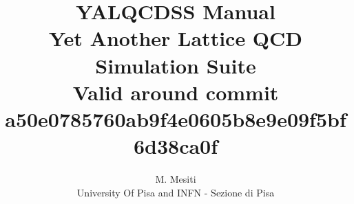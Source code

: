 \documentclass[a4paper,10pt]{book}
\title{{\Huge \bf YALQCDSS Manual} \\
Yet Another Lattice QCD Simulation Suite \\
{\small Valid around commit 
a50e0785760ab9f4e0605b8e9e09f5bf6d38ca0f
}}
\author{M. Mesiti\\{\small University Of Pisa and INFN - Sezione di Pisa}}
\begin{document}
\maketitle
\date{}
 

  

  
 
  
  
%  
\end{document}
